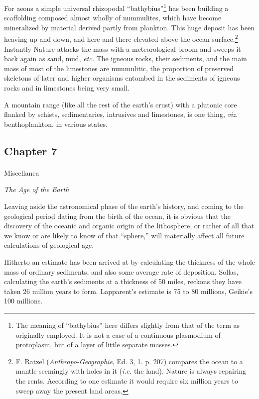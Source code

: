 \documentclass[a4paper, 12pt, oneside]{article}
\begin{document}
For aeons a simple universal rhizopodal ``bathybius''\footnote{The meaning of ``bathybius'' here differs slightly from that of the term as originally employed. It is not a case of a continuous plasmodium of protoplasm, but of a layer of little separate masses.} has been building a scaffolding composed almost wholly of nummulites, which have become mineralized by material derived partly from plankton. This huge deposit has been heaving up and down, and here and there elevated above the ocean surface.\footnote{F. Ratzel (\emph{Anthropo-Geographie}, Ed. 3, 1. p. 207) compares the ocean to a mantle seemingly with holes in it (\emph{i.e.} the land). Nature is always repairing the rents. According to one estimate it would require six million years to sweep away the present land areas.} Instantly Nature attacks the mass with a meteorological broom and sweeps it back again as sand, mud, \emph{etc.} The igneous rocks, their sediments, and the main mass of most of the limestones are nummulitic, the proportion of preserved skeletons of later and higher organisms entombed in the sediments of igneous rocks and in limestones being very small.

A mountain range (like all the rest of the earth's crust) with a plutonic core flanked by schists, sedimentaries, intrusives and limestones, is one thing, \emph{viz.} benthoplankton, in various states.
\clearpage
\subsection{Chapter 7}
\paragraph{}
Miscellanea

\emph{The Age of the Earth}

Leaving aside the astronomical phase of the earth's history, and coming to the geological period dating from the birth of the ocean, it is obvious that the discovery of the oceanic and organic origin of the lithosphere, or rather of all that we know or are likely to know of that ``sphere,'' will materially affect all future calculations of geological age.

Hitherto an estimate has been arrived at by calculating the thickness of the whole mass of ordinary sediments, and also some average rate of deposition. Sollas, calculating the earth's sediments at a thickness of 50 miles, reckons they have taken 26 million years to form. Lapparent's estimate is 75 to 80 millions, Geikie's 100 millions.
\end{document}
